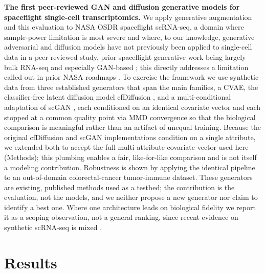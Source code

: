 \documentclass[11pt]{article}
\begin{document}
\noindent\textbf{The first peer-reviewed GAN and diffusion generative models for spaceflight single-cell transcriptomics.} We apply generative augmentation and this evaluation to NASA OSDR spaceflight scRNA-seq, a domain where sample-power limitation is most severe and where, to our knowledge, generative adversarial and diffusion models have not previously been applied to single-cell data in a peer-reviewed study, prior spaceflight generative work being largely bulk RNA-seq and especially GAN-based \cite{ganbio}; this directly addresses a limitation called out in prior NASA roadmaps \cite{scott,ilangovan}. To exercise the framework we use synthetic data from three established generators that span the main families, a CVAE, the classifier-free latent diffusion model cfDiffusion \cite{cfdiffusion}, and a multi-conditional adaptation of scGAN \cite{scgan}, each conditioned on an identical covariate vector and each stopped at a common quality point via MMD convergence so that the biological comparison is meaningful rather than an artifact of unequal training. Because the original cfDiffusion and scGAN implementations condition on a single attribute, we extended both to accept the full multi-attribute covariate vector used here (Methods); this plumbing enables a fair, like-for-like comparison and is not itself a modeling contribution. Robustness is shown by applying the identical pipeline to an out-of-domain colorectal-cancer tumor-immune dataset. These generators are existing, published methods used as a testbed; the contribution is the evaluation, not the models, and we neither propose a new generator nor claim to identify a best one. Where one architecture leads on biological fidelity we report it as a scoping observation, not a general ranking, since recent evidence on synthetic scRNA-seq is mixed \cite{cfgen,scgft,scdiffusion}.

\section{Results}
\end{document}
